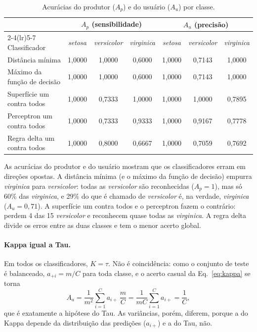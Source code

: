\documentclass[12pt,a4paper]{article}
\newcommand{\setosa}{\emph{setosa}}
\newcommand{\versicolor}{\emph{versicolor}}
\newcommand{\virginica}{\emph{virginica}}
\begin{document}
\begin{table}[H]
\centering
\caption{Acurácias do produtor ($A_p$) e do usuário ($A_u$) por classe.}
\label{tab:prod_usu}
\small
\begin{tabular}{lcccccc}
\toprule
 & \multicolumn{3}{c}{$A_p$ (sensibilidade)} & \multicolumn{3}{c}{$A_u$ (precisão)} \\
\cmidrule(lr){2-4}\cmidrule(lr){5-7}
Classificador & \setosa{} & \versicolor{} & \virginica{} & \setosa{} & \versicolor{} & \virginica{} \\
\midrule
Distância mínima            & 1,0000 & 1,0000 & 0,6000 & 1,0000 & 0,7143 & 1,0000 \\
Máximo da função de decisão & 1,0000 & 1,0000 & 0,6000 & 1,0000 & 0,7143 & 1,0000 \\
Superfície um contra todos  & 1,0000 & 0,7333 & 1,0000 & 1,0000 & 1,0000 & 0,7895 \\
Perceptron um contra todos  & 1,0000 & 0,7333 & 0,9333 & 1,0000 & 0,9167 & 0,7778 \\
Regra delta um contra todos & 1,0000 & 0,8000 & 0,6667 & 1,0000 & 0,7059 & 0,7692 \\
\bottomrule
\end{tabular}
\end{table}

As acurácias do produtor e do usuário mostram que os classificadores erram em direções opostas. A distância mínima (e o máximo da função de decisão) empurra \virginica{} para \versicolor{}: todas as \versicolor{} são reconhecidas ($A_p = 1$), mas só 60\% das \virginica{}, e 29\% do que é chamado de \versicolor{} é, na verdade, \virginica{} ($A_u = 0{,}71$). A superfície um contra todos e o perceptron fazem o contrário: perdem 4 das 15 \versicolor{} e reconhecem quase todas as \virginica{}. A regra delta divide os erros entre as duas classes e tem o menor acerto global.

\paragraph{Kappa igual a Tau.} Em todos os classificadores, $K = \tau$. Não é coincidência: como o conjunto de teste é balanceado, $a_{+i} = m/C$ para toda classe, e o acerto casual da Eq.~\eqref{eq:kappa} se torna
\begin{equation}
  A_a = \frac{1}{m^2}\sum_{i=1}^{C} a_{i+}\,\frac{m}{C} = \frac{1}{mC}\sum_{i=1}^{C} a_{i+} = \frac{1}{C},
\end{equation}
que é exatamente a hipótese do Tau. As variâncias, porém, diferem, porque a do Kappa depende da distribuição das predições ($a_{i+}$) e a do Tau, não.
\end{document}
